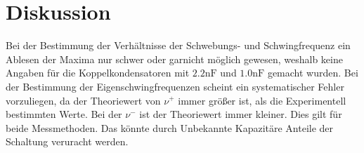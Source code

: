 \section{Diskussion}
\label{sec:Diskussion}
Bei der Bestimmung der Verhältnisse der Schwebungs- und Schwingfrequenz ein
Ablesen der Maxima nur schwer oder garnicht möglich gewesen, weshalb keine Angaben
für die Koppelkondensatoren mit $2.2\si{\nano\farad}$ und $1.0\si{\nano\farad}$
gemacht wurden.
Bei der Bestimmung der Eigenschwingfrequenzen scheint ein systematischer Fehler
vorzuliegen, da der Theoriewert  von $\nu^{+}$ immer größer ist, als die Experimentell
bestimmten Werte. Bei der $\nu^{-}$ ist der Theoriewert immer kleiner. Dies gilt für
beide Messmethoden. Das könnte durch Unbekannte Kapazitäre
Anteile der Schaltung veruracht werden.
